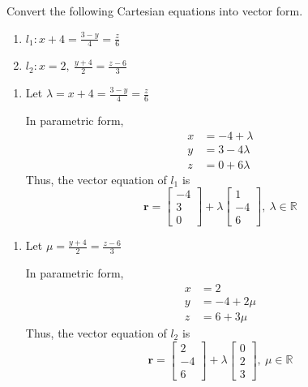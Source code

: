 \documentclass[11pt,a4paper]{book}
\newcommand{\R}{\mathbb{R}}
\begin{document}
\begin{example}

Convert the following Cartesian equations into vector form.

\begin{enumerate}[label=(\alph*)]

\item  ${\displaystyle l_{1}:x+4=\frac{3-y}{4}=\frac{z}{6}}$

\item  ${\displaystyle l_{2}:x=2,\:\frac{y+4}{2}=\frac{z-6}{3}}$

\end{enumerate}

\Solution

\begin{minipage}[t]{0.5\textwidth}

\begin{enumerate}[label=(\alph*)]

\item  Let ${\displaystyle \lambda=x+4=\frac{3-y}{4}=\frac{z}{6}}$

In parametric form,
\begin{align*}
x & =-4+\lambda\\
y & =3-4\lambda\\
z & =0+6\lambda
\end{align*}
Thus, the vector equation of $l_{1}$ is
\[
\textbf{r}=\begin{bmatrix}-4\\
3\\
0
\end{bmatrix}+\lambda\begin{bmatrix}1\\
-4\\
6
\end{bmatrix},\:\lambda\in\R
\]

\end{enumerate}

\end{minipage}
\begin{minipage}[t]{0.5\textwidth}

\begin{enumerate}[label=(\alph*),start=2]

\item  Let ${\displaystyle \mu=\frac{y+4}{2}=\frac{z-6}{3}}$

In parametric form,
\begin{align*}
x & =2\\
y & =-4+2\mu\\
z & =6+3\mu
\end{align*}
Thus, the vector equation of $l_{2}$ is
\[
\textbf{r}=\begin{bmatrix}2\\
-4\\
6
\end{bmatrix}+\lambda\begin{bmatrix}0\\
2\\
3
\end{bmatrix},\:\mu\in\R
\]


\end{enumerate}
\end{minipage}
\end{example}
\end{document}
